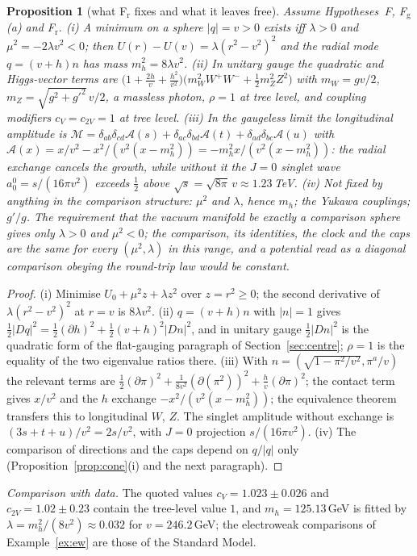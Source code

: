 \documentclass[aps,pra,onecolumn,superscriptaddress,nofootinbib,10pt]{revtex4-2}
\newtheorem{proposition}[theorem]{Proposition}
\theoremstyle{definition}
\theoremstyle{remark}
\begin{document}
\begin{proposition}[what F$_{\mathrm r}$ fixes and what it leaves free]\label{prop:radial}
Assume Hypotheses~F, F$_{\mathrm g}$(a) and F$_{\mathrm r}$.
(i) A minimum on a sphere $\lvert q\rvert=v>0$ exists iff $\lambda>0$ and $\mu^2=-2\lambda v^2<0$; then
$U(r)-U(v)=\lambda(r^2-v^2)^2$ and the radial mode $q=(v+h)n$ has mass $m_h^2=8\lambda v^2$.
(ii) In unitary gauge the quadratic and Higgs-vector terms are
$\bigl(1+\tfrac{2h}v+\tfrac{h^2}{v^2}\bigr)\bigl(m_W^2W^+W^-+\tfrac12m_Z^2Z^2\bigr)$ with $m_W=gv/2$, $m_Z=\sqrt{g^2+g'^2}\,v/2$, a massless
photon, $\rho=1$ at tree level, and coupling modifiers $c_V=c_{2V}=1$ at tree level.
(iii) In the gaugeless limit the longitudinal amplitude is $\mathcal M=\delta_{ab}\delta_{cd}\mathcal A(s)+\delta_{ac}\delta_{bd}\mathcal A(t)+\delta_{ad}\delta_{bc}\mathcal A(u)$ with
$\mathcal A(x)=x/v^2-x^2/(v^2(x-m_h^2))=-m_h^2x/(v^2(x-m_h^2))$: the radial exchange cancels the growth, while without
it the $J=0$ singlet wave $a_0^0=s/(16\pi v^2)$ exceeds $\tfrac12$ above $\sqrt s=\sqrt{8\pi}\,v\approx1.23$\,TeV.
(iv) Not fixed by anything in the comparison structure: $\mu^2$ and $\lambda$, hence $m_h$; the Yukawa couplings;
$g'/g$.  The requirement that the vacuum manifold be exactly a comparison sphere gives only $\lambda>0$ and
$\mu^2<0$; the comparison, its identities, the clock and the caps are the same for every $(\mu^2,\lambda)$ in this
range, and a potential read as a diagonal comparison obeying the round-trip law would be constant.
\end{proposition}
\begin{proof}
(i) Minimise $U_0+\mu^2z+\lambda z^2$ over $z=r^2\ge0$; the second derivative of $\lambda(r^2-v^2)^2$ at $r=v$ is $8\lambda v^2$.
(ii) $q=(v+h)n$ with $\lvert n\rvert=1$ gives $\tfrac12\lvert Dq\rvert^2=\tfrac12(\partial h)^2+\tfrac12(v+h)^2\lvert Dn\rvert^2$, and in unitary gauge $\tfrac12\lvert Dn\rvert^2$
is the quadratic form of the flat-gauging paragraph of Section~\ref{sec:centre}; $\rho=1$ is the equality of the
two eigenvalue ratios there.  (iii) With $n=(\sqrt{1-\pi^2/v^2},\pi^a/v)$ the relevant terms are
$\tfrac12(\partial\pi)^2+\tfrac1{8v^2}(\partial(\pi^2))^2+\tfrac hv(\partial\pi)^2$; the contact term gives $x/v^2$ and the $h$ exchange
$-x^2/(v^2(x-m_h^2))$; the equivalence theorem \cite{CLT74,LQT77} transfers this to longitudinal $W$, $Z$.  The
singlet amplitude without exchange is $(3s+t+u)/v^2=2s/v^2$, with $J=0$ projection $s/(16\pi v^2)$.
(iv) The comparison of directions and the caps depend on $q/\lvert q\rvert$ only (Proposition~\ref{prop:cone}(i) and the
next paragraph).
\end{proof}
\noindent\emph{Comparison with data.}  The quoted values $c_V=1.023\pm0.026$ and $c_{2V}=1.02\pm0.23$
\cite{ex-PDG26} contain the tree-level value $1$, and $m_h=125.13$\,GeV is fitted by
$\lambda=m_h^2/(8v^2)\approx0.032$ for $v=246.2$\,GeV; the electroweak comparisons of Example~\ref{ex:ew} are those of the
Standard Model.
\end{document}
